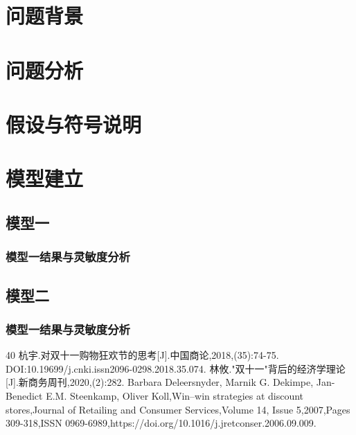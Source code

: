 \documentclass[UTF8]{ctexart}
\begin{document}
\begin{abstract}
	
	\textbf{关键词}:\quad 双十一购物节，基于目标规划的判别模型，演化博弈模型
\end{abstract}

\pagestyle{plain}


\section{问题背景}
\section{问题分析}
\section{假设与符号说明}
\section{模型建立}
\subsection{模型一}
\subsubsection{模型一结果与灵敏度分析}
\subsection{模型二}	
\subsubsection{模型一结果与灵敏度分析}


\begin{thebibliography}{40}
	杭宇.对双十一购物狂欢节的思考[J].中国商论,2018,(35):74-75. DOI:10.19699/j.cnki.issn2096-0298.2018.35.074.
	林攸."双十一"背后的经济学理论[J].新商务周刊,2020,(2):282.
	Barbara Deleersnyder, Marnik G. Dekimpe, Jan-Benedict E.M. Steenkamp, Oliver Koll,Win–win strategies at discount stores,Journal of Retailing and Consumer Services,Volume 14, Issue 5,2007,Pages 309-318,ISSN 0969-6989,https://doi.org/10.1016/j.jretconser.2006.09.009.

	
	
	
\end{thebibliography}
\newpage
{}	%
\end{document}
